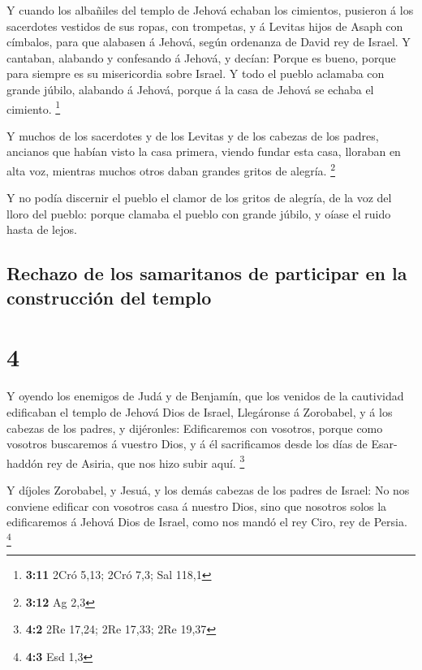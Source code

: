  Y cuando los albañiles del templo de Jehová echaban los
cimientos, pusieron á los sacerdotes vestidos de sus ropas, con
trompetas, y á Levitas hijos de Asaph con címbalos, para que alabasen á
Jehová, según ordenanza de David rey de Israel.  Y
cantaban, alabando y confesando á Jehová, y decían: Porque es bueno,
porque para siempre es su misericordia sobre Israel. Y todo el pueblo
aclamaba con grande júbilo, alabando á Jehová, porque á la casa de
Jehová se echaba el cimiento. \footnote{\textbf{3:11} 2Cró 5,13; 2Cró
  7,3; Sal 118,1}

 Y muchos de los sacerdotes y de los Levitas y de los
cabezas de los padres, ancianos que habían visto la casa primera, viendo
fundar esta casa, lloraban en alta voz, mientras muchos otros daban
grandes gritos de alegría. \footnote{\textbf{3:12} Ag 2,3}

 Y no podía discernir el pueblo el clamor de los gritos de
alegría, de la voz del lloro del pueblo: porque clamaba el pueblo con
grande júbilo, y oíase el ruido hasta de lejos.

\hypertarget{rechazo-de-los-samaritanos-de-participar-en-la-construcciuxf3n-del-templo}{%
\subsection{Rechazo de los samaritanos de participar en la construcción
del
templo}\label{rechazo-de-los-samaritanos-de-participar-en-la-construcciuxf3n-del-templo}}

\hypertarget{section-3}{%
\section{4}\label{section-3}}

 Y oyendo los enemigos de Judá y de Benjamín, que los
venidos de la cautividad edificaban el templo de Jehová Dios de Israel,
 Llegáronse á Zorobabel, y á los cabezas de los padres, y
dijéronles: Edificaremos con vosotros, porque como vosotros buscaremos á
vuestro Dios, y á él sacrificamos desde los días de Esar-haddón rey de
Asiria, que nos hizo subir aquí. \footnote{\textbf{4:2} 2Re 17,24; 2Re
  17,33; 2Re 19,37}

 Y díjoles Zorobabel, y Jesuá, y los demás cabezas de los
padres de Israel: No nos conviene edificar con vosotros casa á nuestro
Dios, sino que nosotros solos la edificaremos á Jehová Dios de Israel,
como nos mandó el rey Ciro, rey de Persia. \footnote{\textbf{4:3} Esd
  1,3}

